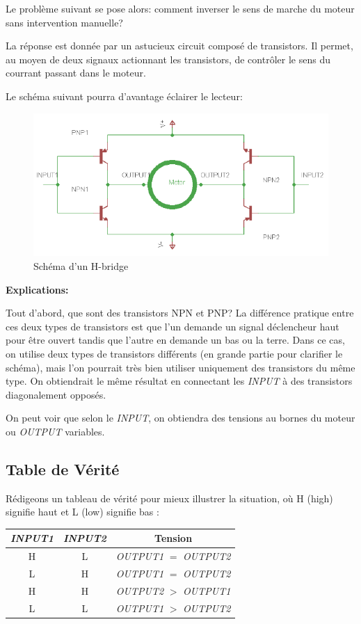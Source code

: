 \documentclass[a4paper,12pt]{article}
\begin{document}
{Le probl\`eme suivant se pose alors: comment inverser le sens de marche du
moteur sans intervention manuelle?

La r\'eponse est donn\'ee par un astucieux circuit compos\'e de
transistors. Il permet, au moyen de deux signaux actionnant les transistors,
de contr\^oler le sens du courrant passant dans le moteur.

Le sch\'ema suivant pourra d'avantage \'eclairer le lecteur:

\begin{figure}[h]
\centering
\includegraphics[width=1.0\textwidth]{figures/H-bridge}
    \caption{\label{H-bridge}Sch\'ema d'un H-bridge}
\end{figure}

\textbf{Explications:}

Tout d'abord, que sont des transistors NPN et PNP? La diff\'erence pratique
entre ces deux types de transistors est que l'un demande un signal
d\'eclencheur haut pour \^etre ouvert tandis que l'autre en demande un
bas ou la terre. Dans ce cas, on utilise deux types de transistors
diff\'erents (en grande partie pour clarifier le sch\'ema), mais l'on pourrait
tr\`es bien utiliser uniquement des transistors du m\^eme type. On obtiendrait
le m\^eme r\'esultat en connectant les \emph{INPUT} \`a des transistors
diagonalement oppos\'es\cite{RobotRoom}.

On peut voir que selon le \emph{INPUT}, on obtiendra des tensions au bornes du
moteur ou \emph{OUTPUT} variables.
\subsection{Table de V\'erit\'e}
R\'edigeons un tableau de v\'erit\'e pour mieux illustrer la situation, o\`u H
(high) signifie haut et L (low) signifie bas :

\begin{table}[h]
\begin{center}
  \begin{tabular}{c|c||c}  
    \emph{INPUT1} & \emph{INPUT2}
    & Tension\\
    \hline
    H & L & \emph{OUTPUT1} $=$ \emph{OUTPUT2}\\
    L & H & \emph{OUTPUT1} $=$ \emph{OUTPUT2}\\
    H & H & \emph{OUTPUT2} $>$ \emph{OUTPUT1}\\
    L & L & \emph{OUTPUT1} $>$ \emph{OUTPUT2}\\
  \end{tabular}
\end{center}


\end{table}}
\end{document}

